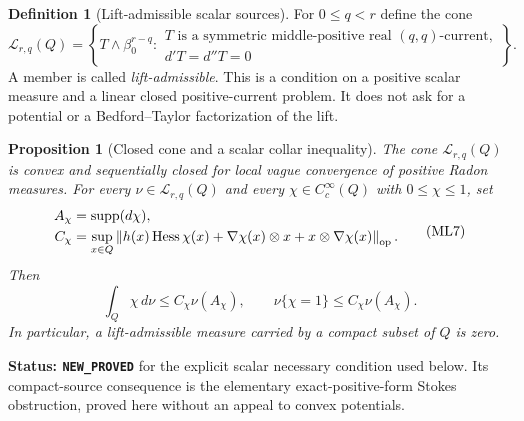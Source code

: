 \documentclass[11pt,a4paper]{article}
\numberwithin{equation}{section}
\newtheorem{proposition}[theorem]{Proposition}
\theoremstyle{definition}
\newtheorem{definition}[theorem]{Definition}
\theoremstyle{remark}
\begin{document}
\begin{definition}[Lift-admissible scalar sources]
\label{def:r12-lift-admissible}
For $0\le q<r$ define the cone
\[
 \mathscr L_{r,q}(Q)=
 \left\{T\wedge\beta_0^{r-q}:
 \begin{array}{l}
 T\text{ is a symmetric middle-positive real }(q,q)\text{-current},\\
 d'T=d''T=0
 \end{array}\right\}.
 \tag{ML6}
\]
A member is called \emph{lift-admissible}.  This is a condition on
a positive scalar measure and a linear closed positive-current
problem.  It does not ask for a potential or a Bedford--Taylor
factorization of the lift.
\end{definition}

\begin{proposition}[Closed cone and a scalar collar inequality]
\label{prop:r12-lift-cone-collar}
The cone $\mathscr L_{r,q}(Q)$ is convex and sequentially closed
for local vague convergence of positive Radon measures.  For every
$\nu\in\mathscr L_{r,q}(Q)$ and every
$\chi\in C_c^\infty(Q)$ with $0\le\chi\le1$, set
\[
 \begin{split}
 A_\chi&=\operatorname{supp}(d\chi),\\
 C_\chi&=\sup_{x\in Q}
 \left\|h(x)\operatorname{Hess}\chi(x)
       +\nabla\chi(x)\otimes x+x\otimes\nabla\chi(x)\right\|_{\rm op}.
 \end{split}
 \tag{ML7}
\]
Then
\[
              \int_Q\chi\,d\nu\le C_\chi\nu(A_\chi),
 \qquad
              \nu\{\chi=1\}\le C_\chi\nu(A_\chi).
 \tag{ML8}
\]
In particular, a lift-admissible measure carried by a compact
subset of $Q$ is zero.
\end{proposition}

\noindent\textbf{Status: \texttt{NEW\_PROVED}} for the
explicit scalar necessary condition used below.  Its compact-source
consequence is the elementary exact-positive-form Stokes obstruction,
proved here without an appeal to convex potentials.
\end{document}
